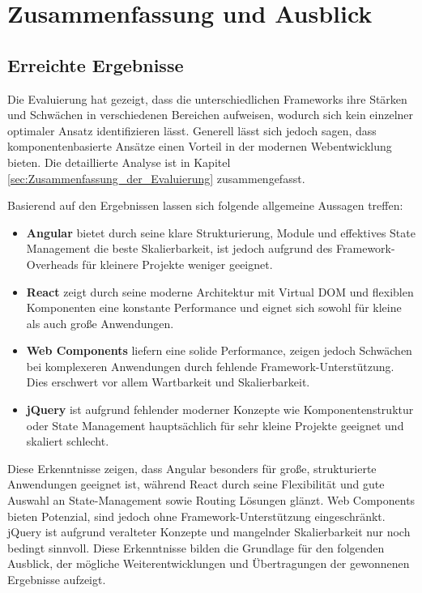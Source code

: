 \documentclass[oneside]{ausarbeitung}
\begin{document}
\chapter{Zusammenfassung und Ausblick}
\label{cha:zusammenfassung}

\section{Erreichte Ergebnisse}
\label{sec:ergebnisse}

Die Evaluierung hat gezeigt, dass die unterschiedlichen Frameworks ihre Stärken und Schwächen in verschiedenen Bereichen aufweisen, wodurch sich kein einzelner optimaler Ansatz identifizieren lässt. Generell lässt sich jedoch sagen, dass komponentenbasierte Ansätze einen Vorteil in der modernen Webentwicklung bieten. Die detaillierte Analyse ist in Kapitel \ref{sec:Zusammenfassung_der_Evaluierung} zusammengefasst. 

Basierend auf den Ergebnissen lassen sich folgende allgemeine Aussagen treffen:

\begin{itemize}
    \item \textbf{Angular} bietet durch seine klare Strukturierung, Module und effektives State Management die beste Skalierbarkeit, ist jedoch aufgrund des Framework-Overheads für kleinere Projekte weniger geeignet.
    \item \textbf{React} zeigt durch seine moderne Architektur mit Virtual DOM und flexiblen Komponenten eine konstante Performance und eignet sich sowohl für kleine als auch große Anwendungen.
    \item \textbf{Web Components} liefern eine solide Performance, zeigen jedoch Schwächen bei komplexeren Anwendungen durch fehlende Framework-Unterstützung. Dies erschwert vor allem Wartbarkeit und Skalierbarkeit.
    \item \textbf{jQuery} ist aufgrund fehlender moderner Konzepte wie Komponentenstruktur oder State Management hauptsächlich für sehr kleine Projekte geeignet und skaliert schlecht.
\end{itemize}

Diese Erkenntnisse zeigen, dass Angular besonders für große, strukturierte Anwendungen geeignet ist, während React durch seine Flexibilität und gute Auswahl an State-Management sowie Routing Lösungen glänzt. Web Components bieten Potenzial, sind jedoch ohne Framework-Unterstützung eingeschränkt. jQuery ist aufgrund veralteter Konzepte und mangelnder Skalierbarkeit nur noch bedingt sinnvoll. Diese Erkenntnisse bilden die Grundlage für den folgenden Ausblick, der mögliche Weiterentwicklungen und Übertragungen der gewonnenen Ergebnisse aufzeigt.
\end{document}
